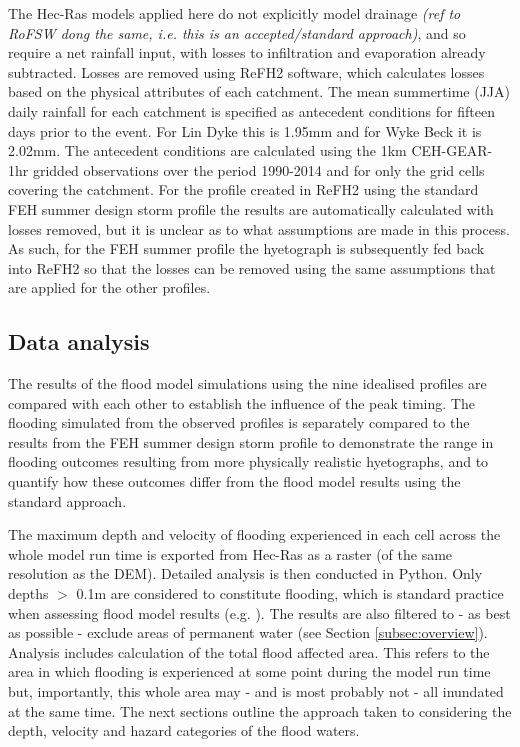 \documentclass[APA,Times2COL]{WileyNJDv5}
\begin{document}
The Hec-Ras models applied here do not explicitly model drainage \textit{(ref to RoFSW dong the same, i.e. this is an accepted/standard approach)}, and so require a net rainfall input, with losses to infiltration and evaporation already subtracted. Losses are removed using ReFH2 software, which calculates losses based on the physical attributes of each catchment. The mean summertime (JJA) daily rainfall for each catchment is specified as antecedent conditions for fifteen days prior to the event. For Lin Dyke this is 1.95mm and for Wyke Beck it is 2.02mm. The antecedent conditions are calculated using the 1km CEH-GEAR-1hr gridded observations \citep{lewis2019gridded} over the period 1990-2014 and for only the grid cells covering the catchment. For the profile created in ReFH2 using the standard FEH summer design storm profile the results are automatically calculated with losses removed, but it is unclear as to what assumptions are made in this process. As such, for the FEH summer profile the hyetograph is subsequently fed back into ReFH2 so that the losses can be removed using the same assumptions that are applied for the other profiles. 


\subsection{Data analysis}\label{subsec:model:data_analysis}
The results of the flood model simulations using the nine idealised profiles are compared with each other to establish the influence of the peak timing. The flooding simulated from the observed profiles is separately compared to the results from the FEH summer design storm profile to demonstrate the range in flooding outcomes resulting from more physically realistic hyetographs, and to quantify how these outcomes differ from the flood model results using the standard approach. 

The maximum depth and velocity of flooding experienced in each cell across the whole model run time is exported from Hec-Ras as a raster (of the same resolution as the DEM). Detailed analysis is then conducted in Python. Only depths $>$ 0.1m are considered to constitute flooding, which is standard practice when assessing flood model results (e.g. \citet{smith2019new}). The results are also filtered to - as best as possible - exclude areas of permanent water (see Section \ref{subsec:overview}). Analysis includes calculation of the total flood affected area. This refers to the area in which flooding is experienced at some point during the model run time but, importantly, this whole area may - and is most probably not - all inundated at the same time. The next sections outline the approach taken to considering the depth, velocity and hazard categories of the flood waters.
\end{document}
